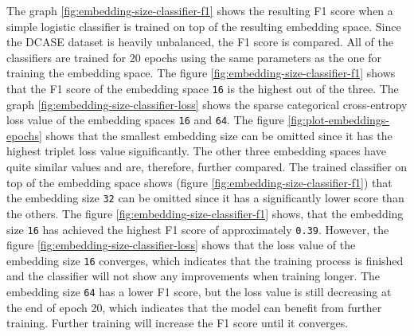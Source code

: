 The graph \ref{fig:embedding-size-classifier-f1} shows the resulting F1 score when a simple logistic classifier is trained on top of the resulting embedding space. Since the \gls{DCASE} dataset is heavily unbalanced, the F1 score is compared. All of the classifiers are trained for 20 epochs using the same parameters as the one for training the embedding space. The figure \ref{fig:embedding-size-classifier-f1} shows that the F1 score of the embedding space \texttt{16} is the highest out of the three.
\newline
\newline
The graph \ref{fig:embedding-size-classifier-loss} shows the sparse categorical cross-entropy loss value of the embedding spaces \texttt{16} and \texttt{64}.
\newline
\newline
The figure \ref{fig:plot-embeddings-epochs} shows that the smallest embedding size can be omitted since it has the highest triplet loss value significantly. The other three embedding spaces have quite similar values and are, therefore, further compared. The trained classifier on top of the embedding space shows (figure \ref{fig:embedding-size-classifier-f1}) that the embedding size \texttt{32} can be omitted since it has a significantly lower score than the others. The figure \ref{fig:embedding-size-classifier-f1} shows, that the embedding size \texttt{16} has achieved the highest F1 score of approximately \texttt{0.39}. However, the figure \ref{fig:embedding-size-classifier-loss} shows that the loss value of the embedding size \texttt{16} converges, which indicates that the training process is finished and the classifier will not show any improvements when training longer. The embedding size \texttt{64} has a lower F1 score, but the loss value is still decreasing at the end of epoch 20, which indicates that the model can benefit from further training. Further training will increase the F1 score until it converges.
